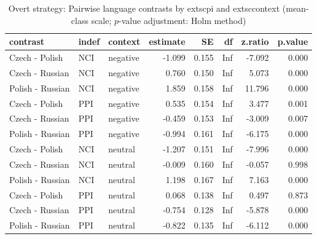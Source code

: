 \begin{table}[!h]
\centering
\caption{Overt strategy: Pairwise language contrasts by 	extsc{pi} and 	extsc{context} (mean-class scale; $p$-value adjustment: Holm method)}
\centering
\begin{tabular}[t]{lllrrrrr}
\toprule
contrast & indef & context & estimate & SE & df & z.ratio & p.value\\
\midrule
Czech - Polish & NCI & negative & -1.099 & 0.155 & Inf & -7.092 & 0.000\\
Czech - Russian & NCI & negative & 0.760 & 0.150 & Inf & 5.073 & 0.000\\
Polish - Russian & NCI & negative & 1.859 & 0.158 & Inf & 11.796 & 0.000\\
Czech - Polish & PPI & negative & 0.535 & 0.154 & Inf & 3.477 & 0.001\\
Czech - Russian & PPI & negative & -0.459 & 0.153 & Inf & -3.009 & 0.007\\
\addlinespace
Polish - Russian & PPI & negative & -0.994 & 0.161 & Inf & -6.175 & 0.000\\
Czech - Polish & NCI & neutral & -1.207 & 0.151 & Inf & -7.996 & 0.000\\
Czech - Russian & NCI & neutral & -0.009 & 0.160 & Inf & -0.057 & 0.998\\
Polish - Russian & NCI & neutral & 1.198 & 0.167 & Inf & 7.163 & 0.000\\
Czech - Polish & PPI & neutral & 0.068 & 0.138 & Inf & 0.497 & 0.873\\
\addlinespace
Czech - Russian & PPI & neutral & -0.754 & 0.128 & Inf & -5.878 & 0.000\\
Polish - Russian & PPI & neutral & -0.822 & 0.135 & Inf & -6.112 & 0.000\\
\bottomrule
\end{tabular}
\end{table}
